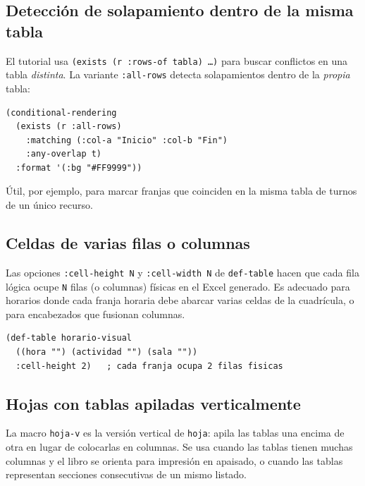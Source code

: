 \documentclass[12pt,a4paper]{report}
\begin{document}
\subsection*{Detección de solapamiento dentro de la misma tabla}

El tutorial usa \texttt{(exists (r :rows-of tabla) \ldots)} para buscar
conflictos en una tabla \emph{distinta}.  La variante \texttt{:all-rows}
detecta solapamientos dentro de la \emph{propia} tabla:

\begin{lstlisting}
(conditional-rendering
  (exists (r :all-rows)
    :matching (:col-a "Inicio" :col-b "Fin")
    :any-overlap t)
  :format '(:bg "#FF9999"))
\end{lstlisting}

Útil, por ejemplo, para marcar franjas que coinciden en la misma tabla de
turnos de un único recurso.

\subsection*{Celdas de varias filas o columnas}

Las opciones \texttt{:cell-height~N} y \texttt{:cell-width~N} de
\texttt{def-table} hacen que cada fila lógica ocupe \texttt{N} filas
(o columnas) físicas en el Excel generado.  Es adecuado para horarios
donde cada franja horaria debe abarcar varias celdas de la cuadrícula,
o para encabezados que fusionan columnas.

\begin{lstlisting}
(def-table horario-visual
  ((hora "") (actividad "") (sala ""))
  :cell-height 2)   ; cada franja ocupa 2 filas fisicas
\end{lstlisting}

\subsection*{Hojas con tablas apiladas verticalmente}

La macro \texttt{hoja-v} es la versión vertical de \texttt{hoja}: apila
las tablas una encima de otra en lugar de colocarlas en columnas.
Se usa cuando las tablas tienen muchas columnas y el libro se orienta para
impresión en apaisado, o cuando las tablas representan secciones
consecutivas de un mismo listado.
\end{document}
